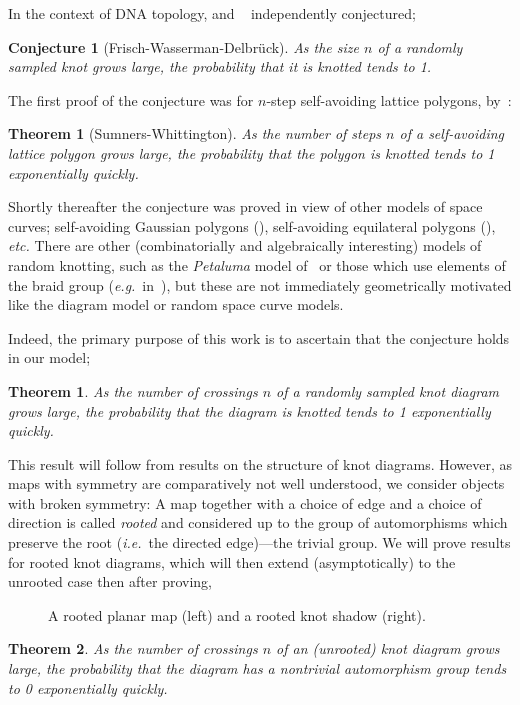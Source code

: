 \documentclass[submission%
]{dmtcs}
\newtheorem*{conjecture}{Conjecture}
\newtheorem{theorem}{Theorem}
\newtheorem*{untheorem}{Theorem}
\begin{document}
In the context of DNA topology, \cite{Frisch_1961} and
~\cite{delbruck1962ams} independently conjectured;
\begin{conjecture}[Frisch-Wasserman-Delbr\"uck]
  As the size $n$ of a randomly sampled knot grows large, the
  probability that it is knotted tends to 1.
\end{conjecture}
The first proof of the conjecture was for $n$-step self-avoiding
lattice polygons, by~\cite{Sumners_1988}:
\begin{untheorem}[Sumners-Whittington]
  As the number of steps $n$ of a self-avoiding lattice polygon grows
  large, the probability that the polygon is knotted tends to 1
  exponentially quickly.
\end{untheorem}
Shortly thereafter the conjecture was proved in view of other models
of space curves; self-avoiding Gaussian polygons
(\cite{douglas94gauss}), self-avoiding equilateral polygons
(\cite{diao95eqpoly}), \textit{etc.} There are other (combinatorially
and algebraically interesting) models of random knotting, such as the
\emph{Petaluma} model of~\cite{petaluma1} or those which use elements
of the braid group (\textit{e.g.}\ in~\cite{Nechaev:1996gv}), but these are not
immediately geometrically motivated like the diagram model or random
space curve models.

Indeed, the primary purpose of this work is to ascertain that the
conjecture holds in our model;
\begin{theorem}
  \label{thm:knotted}
  As the number of crossings $n$ of a randomly sampled knot diagram
  grows large, the probability that the diagram is knotted tends to 1
  exponentially quickly.
\end{theorem}
This result will follow from results on the structure of knot
diagrams. However, as maps with symmetry are comparatively not well
understood, we consider objects with broken symmetry: A map together
with a choice of edge and a choice of direction is called
\emph{rooted} and considered up to the group of automorphisms which
preserve the root (\textit{i.e.}\ the directed edge)---the trivial
group. We will prove results for rooted knot diagrams, which will then
extend (asymptotically) to the unrooted case then after proving,
\begin{figure}[htbp]
  \centering
  
  \caption{A rooted planar map (left) and a rooted knot shadow (right).}
  \label{fig:planar-map-eg}
\end{figure}

\begin{theorem}
  \label{thm:asymm}
  As the number of crossings $n$ of an (unrooted) knot diagram grows
  large, the probability that the diagram has a nontrivial
  automorphism group tends to 0 exponentially quickly.
\end{theorem}
\end{document}
